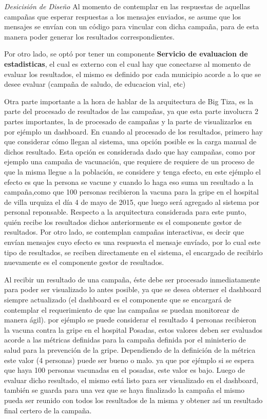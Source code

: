 \documentclass[a4paper, 11pt]{article}
\begin{document}
\emph{Desicisión de Diseño}
Al momento de contemplar en las respuestas de aquellas campañas que esperar respuestas a los mensajes enviados, se asume que los mensajes se envían con un código para vincular con dicha campaña, para de esta manera poder generar los resultados correspondientes.

Por otro lado, se optó por tener un componente \textbf{Servicio de evaluacion de estadisticas}, el cual es externo con el cual hay que conectarse al momento de evaluar los resultados, el mismo es definido por cada municipio acorde a lo que se desee evaluar (campaña de saludo, de educacion vial, etc)

Otra parte importante a la hora de hablar de la arquitectura de Big Tiza, es la parte del procesado de resultados de las campañas, ya que esta parte involucra 2 partes importantes, la de procesado de campañas y la parte de visualizarlos en por ejémplo un dashboard.
En cuando al procesado de los resultados, primero hay que considerar cómo llegan al sistema, una opción posible es la carga manual de dichos resultado. Esta opción es considerada dado que hay campañas, como por ejemplo una campaña de vacunación, que requiere de requiere de un proceso de que la misma llegue a la población, se considere y tenga efecto, en este ejémplo el efecto es que la persona se vacune y cuando lo haga eso suma un resultado a la campaña,como que 100 personas recibieron la vacuna para la gripe en el hospital de villa urquiza el día 4 de mayo de 2015, que luego será agregado al sistema por personal reponsable.
Respecto a la arquitectura considerada para este punto, quién recibe los resultados dichos anteriormente es el componente gestor de resultados.
Por otro lado, se contemplan campañas interactivas, es decir que envían mensajes cuyo efecto es una respuesta el mensaje envíado, por lo cual este tipo de resultados, se reciben directamente en el sistema, el encargado de recibirlo nuevamente es el componente gestor de resultados.

Al recibir un resultado de una campaña, éste debe ser procesado inmediatamente para poder ser visualizado lo antes posible, ya que se desea obterner el dashboard siempre actualizado (el dashboard es el componente que se encargará de contemplar el requerimiento de que las campañas se puedan monitorear de manera ágil). por ejémplo se puede considerar el resultado 4 personas recibieron la vacuna contra la gripe en el hospital Posadas, estos valores deben ser evaluados acorde a las métricas definidas para la campaña definida por el ministerio de salud para la prevención de la gripe. Dependiendo de la definición de la métrica este valor (4 personas) puede ser bueno o malo. ya que por ejémplo si se espera que haya 100 personas vacunadas en el posadas, este valor es bajo. Luego de evaluar dicho resultado, el mismo está listo para ser visualizado en el dashboard, también se guarda para una vez que se haya finalizado la campaña el mismo pueda ser reunido con todos los resultados de la misma y obtener así un resultado final certero de la campaña.
\end{document}
